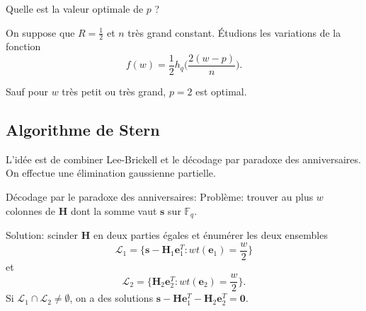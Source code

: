 \documentclass{scrartcl}[a4paper,9pt,headings=small,footinclude=false]
\theoremstyle{definition}
\theoremstyle{remark}
\begin{document}
Quelle est la valeur optimale de $p$ ?

On suppose que $R=\frac{1}{2}$ et $n$ très grand constant.
Étudions les variations de la fonction
\[
f(w)= \frac{1}{2} h_q\bigg(\frac{2(w - p)}{n}\bigg).
\]


Sauf pour $w$ très petit ou très grand, $p=2$ est optimal.



\subsection{Algorithme de Stern}

L'idée est de combiner Lee-Brickell et le décodage par paradoxe des anniversaires. On effectue une élimination gaussienne partielle.

Décodage par le paradoxe des anniversaires:
Problème: trouver au plus $w$ colonnes de $\textbf{H}$ dont la somme vaut $\textbf{s}$ sur $\mathbb{F}_q$.

Solution: scinder $\textbf{H}$ en deux parties égales et énumérer les deux ensembles
\[\mathcal{L}_1=\big\{ \textbf{s}-\textbf{H}_1\textbf{e}_1^T : wt(\textbf{e}_1) =\frac{w}{2} \big\}\]
et \[\mathcal{L}_2=\big\{ \textbf{H}_2 \textbf{e}_2^T : wt(\textbf{e}_2) = \frac{w}{2}\big\}.\]
Si $\mathcal{L}_1\cap \mathcal{L}_2\neq \emptyset$, on a des solutions $\textbf{s}-\textbf{H}\textbf{e}_1^T-\textbf{H}_2\textbf{e}_2^T=\textbf{0}$.
\end{document}
